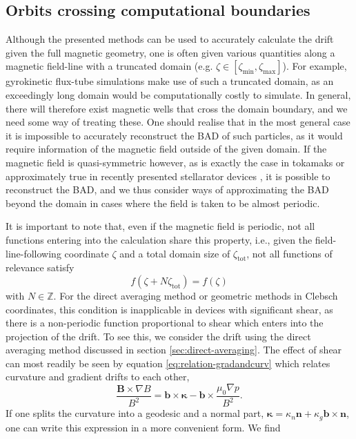 \subsection{Orbits crossing computational boundaries}
Although the presented methods can be used to accurately calculate the drift given the full magnetic geometry, one is often given various quantities along a magnetic field-line with a truncated domain (e.g. $\zeta \in [\zeta_\mathrm{min},\zeta_\mathrm{max}]$). For example, gyrokinetic flux-tube simulations make use of such a truncated domain, as an exceedingly long domain would be computationally costly to simulate. In general, there will therefore exist magnetic wells that cross the domain boundary, and we need some way of treating these. One should realise that in the most general case it is impossible to accurately reconstruct the BAD of such particles, as it would require information of the magnetic field outside of the given domain. If the magnetic field is quasi-symmetric however, as is exactly the case in tokamaks or approximately true in recently presented stellarator devices \cite{landreman2022magnetic}, it is possible to reconstruct the BAD, and we thus consider ways of approximating the BAD beyond the domain in cases where the field is taken to be almost periodic. \par 
It is important to note that, even if the magnetic field is periodic, not all functions entering into the calculation share this property, i.e., given the field-line-following coordinate $\zeta$ and a total domain size of $\zeta_\mathrm{tot}$, not all functions of relevance satisfy
\begin{equation}
    f(\zeta+N\zeta_\mathrm{tot}) = f(\zeta)
\end{equation}
with $N \in \mathbb{Z}$. For the direct averaging method or geometric methods in Clebsch coordinates, this condition is inapplicable in devices with significant shear, as there is a non-periodic function proportional to shear which enters into the projection of the drift. To see this, we consider the drift using the direct averaging method discussed in section \ref{sec:direct-averaging}. The effect of shear can most readily be seen by  equation \eqref{eq:relation-gradandcurv} which relates curvature and gradient drifts to each other,
\begin{equation}
    \frac{\mathbf{B} \times \nabla B}{B^2} = \mathbf{b} \times \boldsymbol{\kappa} - \mathbf{b} \times \frac{\mu_0 \nabla p}{B^2}.
\end{equation}
If one splits the curvature into a geodesic and a normal part, $\boldsymbol{\kappa} = \kappa_n \mathbf{n} + \kappa_g \mathbf{b} \times \mathbf{n} $, one can write this expression in a more convenient form. We find
